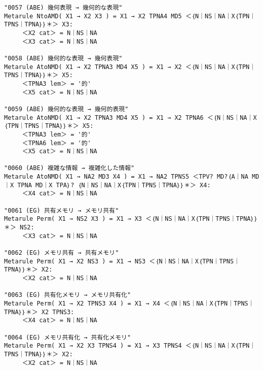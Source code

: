 {\begin{verbatim}
"0057 (ABE) 幾何表現 → 幾何的な表現"
Metarule NtoAMD( X1 → X2 X3 ) = X1 → X2 TPNA4 MD5 ＜｛N｜NS｜NA｜X｛TPN｜TPNS｜TPNA｝｝＊＞ X3:
     ＜X2 cat＞ = N｜NS｜NA
     ＜X3 cat＞ = N｜NS｜NA

"0058 (ABE) 幾何的な表現 → 幾何表現"
Metarule AtoNMD( X1 → X2 TPNA3 MD4 X5 ) = X1 → X2 ＜｛N｜NS｜NA｜X｛TPN｜TPNS｜TPNA｝｝＊＞ X5:
     ＜TPNA3 lem＞ = '的'
     ＜X5 cat＞ = N｜NS｜NA

"0059 (ABE) 幾何的な表現 → 幾何的表現"
Metarule AtoNMD( X1 → X2 TPNA3 MD4 X5 ) = X1 → X2 TPNA6 ＜｛N｜NS｜NA｜X｛TPN｜TPNS｜TPNA｝｝＊＞ X5:
     ＜TPNA3 lem＞ = '的'
     ＜TPNA6 lem＞ = '的'
     ＜X5 cat＞ = N｜NS｜NA

"0060 (ABE) 複雑な情報 → 複雑化した情報"
Metarule AtoNMD( X1 → NA2 MD3 X4 ) = X1 → NA2 TPNS5 ＜TPV? MD?｛A｜NA MD｜X TPNA MD｜X TPA｝? ｛N｜NS｜NA｜X｛TPN｜TPNS｜TPNA｝｝＊＞ X4:
     ＜X4 cat＞ = N｜NS｜NA

"0061 (EG) 共有メモリ → メモリ共有"
Metarule Perm( X1 → NS2 X3 ) = X1 → X3 ＜｛N｜NS｜NA｜X｛TPN｜TPNS｜TPNA｝｝＊＞ NS2:
     ＜X3 cat＞ = N｜NS｜NA

"0062 (EG) メモリ共有 → 共有メモリ"
Metarule Perm( X1 → X2 NS3 ) = X1 → NS3 ＜｛N｜NS｜NA｜X｛TPN｜TPNS｜TPNA｝｝＊＞ X2:
     ＜X2 cat＞ = N｜NS｜NA

"0063 (EG) 共有化メモリ → メモリ共有化"
Metarule Perm( X1 → X2 TPNS3 X4 ) = X1 → X4 ＜｛N｜NS｜NA｜X｛TPN｜TPNS｜TPNA｝｝＊＞ X2 TPNS3:
     ＜X4 cat＞ = N｜NS｜NA

"0064 (EG) メモリ共有化 → 共有化メモリ"
Metarule Perm( X1 → X2 X3 TPNS4 ) = X1 → X3 TPNS4 ＜｛N｜NS｜NA｜X｛TPN｜TPNS｜TPNA｝｝＊＞ X2:
     ＜X2 cat＞ = N｜NS｜NA
\end{verbatim}
}


